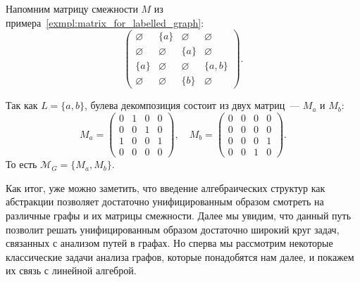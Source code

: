 \begin{example}
    \label{exmpl:bool_decomposition}
    Напомним матрицу смежности $M$ из примера~\ref{exmpl:matrix_for_labelled_graph}:
    \[
        \begin{pmatrix}
            \varnothing & \{a\}       & \varnothing & \varnothing \\
            \varnothing & \varnothing & \{a\}       & \varnothing \\
            \{a\}       & \varnothing & \varnothing & \{a,b\}     \\
            \varnothing & \varnothing & \{b\}       & \varnothing
        \end{pmatrix}.
    \]

    Так как $L = \{a, b\}$, булева декомпозиция состоит из двух матриц~--- $M_a$ и $M_b$:
    \[
        M_a = \begin{pmatrix}
            0 & 1 & 0 & 0 \\
            0 & 0 & 1 & 0 \\
            1 & 0 & 0 & 1 \\
            0 & 0 & 0 & 0
        \end{pmatrix},
        \quad
        M_b = \begin{pmatrix}
            0 & 0 & 0 & 0 \\
            0 & 0 & 0 & 0 \\
            0 & 0 & 0 & 1 \\
            0 & 0 & 1 & 0
        \end{pmatrix}.
    \]
    То есть $\mathcal{M}_G = \{M_a, M_b\}$.
\end{example}

Как итог, уже можно заметить, что введение алгебраических структур как абстракции позволяет достаточно унифицированным образом смотреть на различные графы и их матрицы смежности.
Далее мы увидим, что данный путь позволит решать унифицированным образом достаточно широкий круг задач, связанных с анализом путей в графах.
Но сперва мы рассмотрим некоторые классические задачи анализа графов, которые понадобятся нам далее, и покажем их связь с линейной алгеброй.
